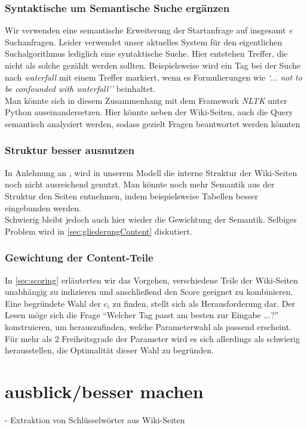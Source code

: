 \documentclass[12pt,pdftex,a4paper]{article}
\begin{document}
\subsubsection{Syntaktische um Semantische Suche ergänzen}\label{sec:semantikInSuche}
Wir verwenden eine semantische Erweiterung der Startanfrage auf insgesamt \textit{e} Suchanfragen. Leider verwendet unser aktuelles System für den eigentlichen Suchalgorithmus lediglich eine syntaktische Suche. Hier entstehen Treffer, die nicht als solche gezählt werden sollten. Beispielsweise wird ein Tag bei der Suche nach \textit{waterfall} mit einem Treffer markiert, wenn es Formulierungen wie \textit{`... not to be confounded with waterfall''} beinhaltet.\\
Man könnte sich in diesem Zusammenhang mit dem Framework \textit{NLTK} unter Python auseinandersetzen. Hier könnte neben der Wiki-Seiten, auch die Query semantisch analysiert werden, sodass gezielt Fragen beantwortet werden könnten
\subsubsection{Struktur besser ausnutzen}
In Anlehnung an , wird in unserem Modell die interne Struktur der Wiki-Seiten noch nicht ausreichend genutzt. Man könnte noch mehr Semantik aus der Struktur den Seiten entnehmen, indem beispielsweise Tabellen besser eingebunden werden. \\
Schwierig bleibt jedoch auch hier wieder die Gewichtung der Semantik. Selbiges Problem wird in \autoref{sec:gliederungContent} diskutiert.
\subsubsection{Gewichtung der Content-Teile}
\label{sec:gliederungContent}
In \autoref{sec:scoring} erläuterten wir das Vorgehen, verschiedene Teile der Wiki-Seiten unabhängig zu indizieren und anschließend den Score geeignet zu kombinieren. Eine begründete Wahl der $c_i$ zu finden, stellt sich als Herausforderung dar. Der Lesen möge sich die Frage ``Welcher Tag passt am besten zur Eingabe ...?'' konstruieren, um herauszufinden, welche Parameterwahl als passend erscheint. \\
Für mehr als 2 Freiheitsgrade der Parameter wird es sich allerdings als schwierig herausstellen, die Optimalität dieser Wahl zu begründen.

\section{ausblick/besser machen}
- Extraktion von Schlüsselwörter aus Wiki-Seiten
\end{document}

